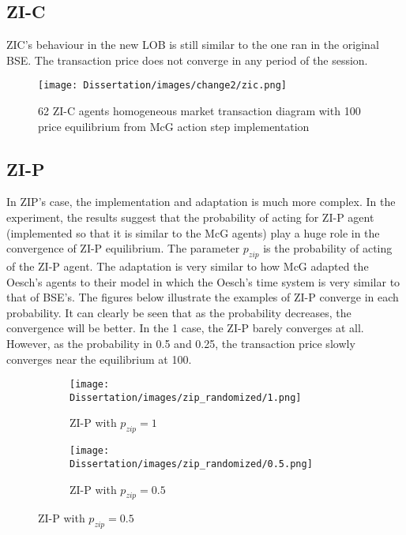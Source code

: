 
\subsection{ZI-C}
ZIC's behaviour in the new LOB is still similar to the one ran in the original BSE. The transaction price does not converge in any period of the session.

\begin{figure}[h]
\texttt{[image: Dissertation/images/change2/zic.png]}
\caption{62 ZI-C agents homogeneous market transaction diagram with 100 price equilibrium from McG action step implementation}  
\end{figure} 
\FloatBarrier

\subsection{ZI-P}
In ZIP's case, the implementation and adaptation is much more complex. In the experiment, the results suggest that the probability of acting for ZI-P agent (implemented so that it is similar to the McG agents) play a huge role in the convergence of ZI-P equilibrium. The parameter $p_{zip}$ is the probability of acting of the ZI-P agent. The adaptation is very similar to how McG adapted the Oesch's agents to their model in which the Oesch's time system is very similar to that of BSE's. The figures below illustrate the examples of ZI-P converge in each probability. It can clearly be seen that as the probability decreases, the convergence will be better. In the 1 case, the ZI-P barely converges at all. However, as the probability in 0.5 and 0.25, the transaction price slowly converges near the equilibrium at 100. 

\begin{figure}[h]
  \begin{subfigure}[b]{0.5\textwidth}
    \texttt{[image: Dissertation/images/zip\_randomized/1.png]}
    \caption{ZI-P with $p_{zip} = 1$ }
    \label{fig:1}
  \end{subfigure}
  \begin{subfigure}[b]{0.5\textwidth}
    \texttt{[image: Dissertation/images/zip\_randomized/0.5.png]}
    \caption{ZI-P with $p_{zip} = 0.5$}
    \label{fig:2}
  \end{subfigure}
\end{figure}

